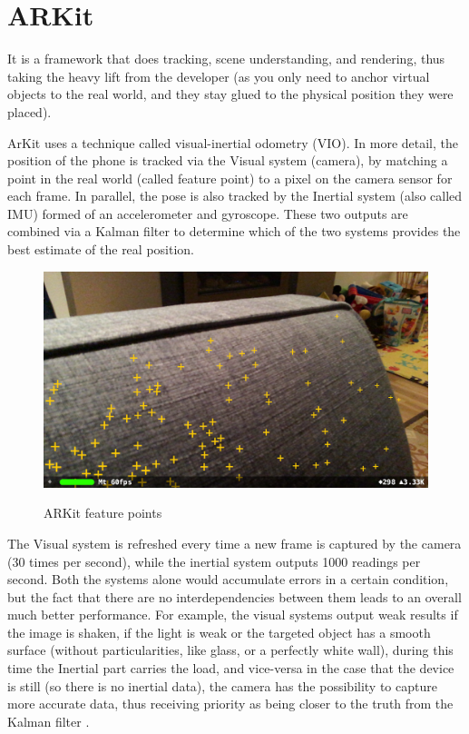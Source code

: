 \documentclass[12 pct]{report}
\begin{document}
\section{ARKit}
It is a framework that does tracking, scene understanding, and rendering, thus taking the heavy lift from the developer (as you only need to anchor virtual objects to the real world, and they stay glued to the physical position they were placed).

ArKit uses a technique called visual-inertial odometry (VIO). In more detail, the position of the phone is tracked via the Visual system (camera), by matching a point in the real world (called feature point) to a pixel on the camera sensor for each frame. In parallel, the pose is also tracked by the Inertial system  (also called IMU) formed of an accelerometer and gyroscope. These two outputs are combined via a Kalman filter to determine which of the two systems provides the best estimate of the real position.

\begin{figure}[]
\includegraphics[width=1\textwidth]{feature-points}
\centering
\label{fig:feature-points}
\caption{ARKit feature points}
\end{figure}


The Visual system is refreshed every time a new frame is captured by the camera (30 times per second), while the inertial system outputs 1000 readings per second. Both the systems alone would accumulate errors in a certain condition, but the fact that there are no interdependencies between them leads to an overall much better performance. For example, the visual systems output weak results if the image is shaken, if the light is weak or the targeted object has a smooth surface (without particularities, like glass, or a perfectly white wall), during this time the Inertial part carries the load, and vice-versa in the case that the device is still (so there is no inertial data), the camera has the possibility to capture more accurate data, thus receiving priority as being closer to the truth from the Kalman filter \cite{matt2017arkit} .
\end{document}
